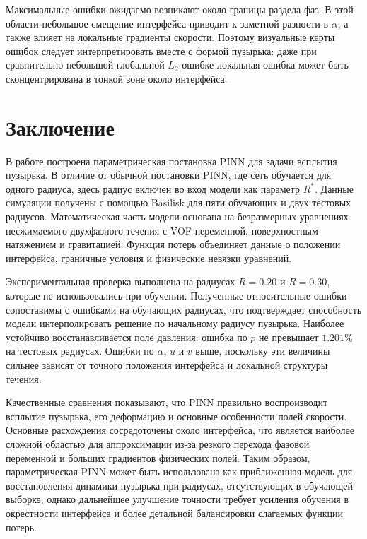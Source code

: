 \documentclass[12pt,a4paper]{article}
\begin{document}
Максимальные ошибки ожидаемо возникают около границы раздела фаз. В этой
области небольшое смещение интерфейса приводит к заметной разности в
\(\alpha\), а также влияет на локальные градиенты скорости. Поэтому визуальные
карты ошибок следует интерпретировать вместе с формой пузырька: даже при
сравнительно небольшой глобальной \(L_2\)-ошибке локальная ошибка может быть
сконцентрирована в тонкой зоне около интерфейса.

\section{Заключение}

В работе построена параметрическая постановка PINN для задачи всплытия пузырька.
В отличие от обычной постановки PINN, где сеть обучается для одного
радиуса, здесь радиус включен во вход модели как параметр \(R^*\).
Данные симуляции получены с помощью Basilisk для пяти обучающих и двух тестовых
радиусов. Математическая часть модели основана на безразмерных уравнениях
несжимаемого двухфазного течения с VOF-переменной, поверхностным натяжением и
гравитацией. Функция потерь объединяет данные о положении интерфейса,
граничные условия и физические невязки уравнений.

Экспериментальная проверка выполнена на радиусах \(R=0.20\) и \(R=0.30\),
которые не использовались при обучении. Полученные относительные ошибки
сопоставимы с ошибками на обучающих радиусах, что подтверждает способность
модели интерполировать решение по начальному радиусу пузырька. Наиболее
устойчиво восстанавливается поле давления: ошибка по \(p\) не превышает
\(1.201\%\) на тестовых радиусах. Ошибки по \(\alpha\), \(u\) и \(v\) выше,
поскольку эти величины сильнее зависят от точного положения интерфейса и
локальной структуры течения.

Качественные сравнения показывают, что PINN правильно воспроизводит всплытие
пузырька, его деформацию и основные особенности полей скорости. Основные
расхождения сосредоточены около интерфейса, что является наиболее сложной
областью для аппроксимации из-за резкого перехода фазовой переменной и больших
градиентов физических полей. Таким образом, параметрическая PINN может быть
использована как приближенная модель для восстановления динамики пузырька при
радиусах, отсутствующих в обучающей выборке, однако дальнейшее улучшение
точности требует усиления обучения в окрестности интерфейса и более детальной
балансировки слагаемых функции потерь.
\end{document}
